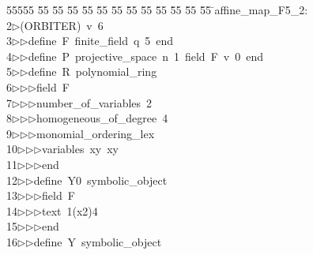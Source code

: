 %
%
\begin{tabbing}
55555 \= 55 \= 55 \= 55 \= 55 \= 55 \= 55 \= 55 \= 55 \= 55 \= 55 \= 55 \= 55 \= \>affine\_map\_F5\_2:\\[0pt]
2\>$\triangleright$\>(ORBITER)\ v\ 6\ \\[0pt]
3\>$\triangleright$\>$\triangleright$\>define\ F\ finite\_field\ q\ 5\ end\ \\[0pt]
4\>$\triangleright$\>$\triangleright$\>define\ P\ projective\_space\ n\ 1\ field\ F\ v\ 0\ end\ \\[0pt]
5\>$\triangleright$\>$\triangleright$\>define\ R\ polynomial\_ring\ \\[0pt]
6\>$\triangleright$\>$\triangleright$\>$\triangleright$\>field\ F\ \\[0pt]
7\>$\triangleright$\>$\triangleright$\>$\triangleright$\>number\_of\_variables\ 2\ \\[0pt]
8\>$\triangleright$\>$\triangleright$\>$\triangleright$\>homogeneous\_of\_degree\ 4\ \\[0pt]
9\>$\triangleright$\>$\triangleright$\>$\triangleright$\>monomial\_ordering\_lex\ \\[0pt]
10\>$\triangleright$\>$\triangleright$\>$\triangleright$\>variables\ xy\ xy\ \\[0pt]
11\>$\triangleright$\>$\triangleright$\>$\triangleright$\>end\ \\[0pt]
12\>$\triangleright$\>$\triangleright$\>define\ Y0\ symbolic\_object\ \\[0pt]
13\>$\triangleright$\>$\triangleright$\>$\triangleright$\>field\ F\ \\[0pt]
14\>$\triangleright$\>$\triangleright$\>$\triangleright$\>text\ 1(x2)4\ \\[0pt]
15\>$\triangleright$\>$\triangleright$\>$\triangleright$\>end\ \\[0pt]
16\>$\triangleright$\>$\triangleright$\>define\ Y\ symbolic\_object\ \\[0pt]

\end{tabbing}
